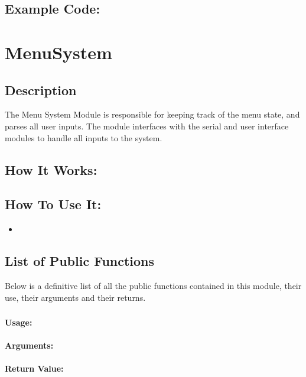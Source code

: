 \documentclass[]{report}
\begin{document}
\section{Example Code:}

\chapter{MenuSystem}
\section{Description}
The Menu System Module is responsible for keeping track of the menu state, and parses all user inputs. The module interfaces with the serial and user interface modules to handle all inputs to the system.

\section{How It Works:}

\section{How To Use It:}
\begin{itemize}
	\item 
\end{itemize}

\section{List of Public Functions}
Below is a definitive list of all the public functions contained in this module, their use, their arguments and their returns.

\subsection{}
\subsubsection{Usage:}

\subsubsection{Arguments:}

\subsubsection{Return Value:}
\end{document}
